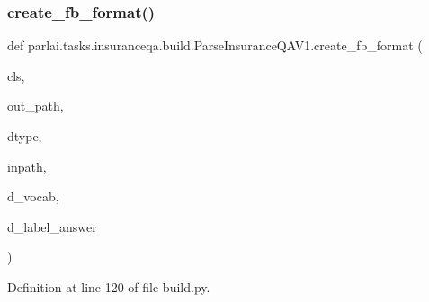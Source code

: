 \subsubsection{\texorpdfstring{create\+\_\+fb\+\_\+format()}{create\_fb\_format()}}
{\footnotesize\ttfamily def parlai.\+tasks.\+insuranceqa.\+build.\+Parse\+Insurance\+Q\+A\+V1.\+create\+\_\+fb\+\_\+format (\begin{DoxyParamCaption}\item[{}]{cls,  }\item[{}]{out\+\_\+path,  }\item[{}]{dtype,  }\item[{}]{inpath,  }\item[{}]{d\+\_\+vocab,  }\item[{}]{d\+\_\+label\+\_\+answer }\end{DoxyParamCaption})}



Definition at line 120 of file build.\+py.



